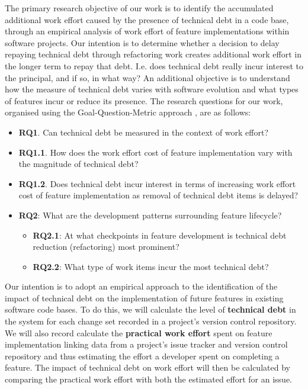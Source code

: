 The primary research objective of our work is to identify the accumulated
additional work effort caused by the presence of technical debt in a code base,
through an empirical analysis of work effort of feature implementations within
software projects.  Our intention is to determine whether a decision to delay
repaying technical debt through refactoring work creates additional work effort
in the longer term to repay that debt. I.e. does technical debt really incur
interest to the principal, and if so, in what way?  An additional objective is
to understand how the measure of technical debt varies with software evolution
and what types of features incur or reduce its presence.  The research questions
for our work, organised using the Goal-Question-Metric approach
\cite{VanSolingen2002}, are as follows:

\begin{itemize}
	\item \textbf{RQ1}. Can technical debt be measured in the context of work
	      effort?

	\item \textbf{RQ1.1}. How does the work effort cost of feature implementation
              vary with the magnitude of technical debt? 

        \item \textbf{RQ1.2}. Does technical debt incur interest in terms of increasing
              work effort cost of feature implementation as removal of technical debt 
              items is delayed?

	\item \textbf{RQ2}: What are the development patterns surrounding feature
	      lifecycle?
	      \begin{itemize}
		      \item \textbf{RQ2.1}: At what checkpoints in feature development
		            is technical debt reduction (refactoring) most prominent?
		      \item \textbf{RQ2.2}: What type of work items incur the most
		            technical debt?
	      \end{itemize}
\end{itemize}

Our intention is to adopt an empirical approach to the identification of the
impact of technical debt on the implementation of future features in existing
software code bases.  To do this, we will calculate the level of
\textbf{technical debt} in the system for each change set recorded in a
project's version control repository.  We will also record calculate the
\textbf{practical work effort} spent on feature implementation linking data from
a project's issue tracker and version control repository and thus estimating the
effort a developer spent on completing a feature.  The impact of technical debt
on work effort will then be calculated by comparing the practical work effort
with both the estimated effort for an issue.

